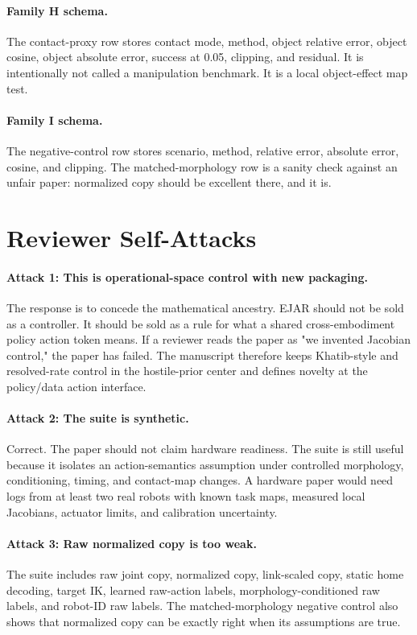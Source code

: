 \documentclass{article}
\begin{document}
\paragraph{Family H schema.}
The contact-proxy row stores contact mode, method, object relative error, object cosine, object absolute error, success at 0.05, clipping, and residual. It is intentionally not called a manipulation benchmark. It is a local object-effect map test.

\paragraph{Family I schema.}
The negative-control row stores scenario, method, relative error, absolute error, cosine, and clipping. The matched-morphology row is a sanity check against an unfair paper: normalized copy should be excellent there, and it is.

\section{Reviewer Self-Attacks}

\paragraph{Attack 1: This is operational-space control with new packaging.}
The response is to concede the mathematical ancestry. EJAR should not be sold as a controller. It should be sold as a rule for what a shared cross-embodiment policy action token means. If a reviewer reads the paper as "we invented Jacobian control," the paper has failed. The manuscript therefore keeps Khatib-style and resolved-rate control in the hostile-prior center and defines novelty at the policy/data action interface.

\paragraph{Attack 2: The suite is synthetic.}
Correct. The paper should not claim hardware readiness. The suite is still useful because it isolates an action-semantics assumption under controlled morphology, conditioning, timing, and contact-map changes. A hardware paper would need logs from at least two real robots with known task maps, measured local Jacobians, actuator limits, and calibration uncertainty.

\paragraph{Attack 3: Raw normalized copy is too weak.}
The suite includes raw joint copy, normalized copy, link-scaled copy, static home decoding, target IK, learned raw-action labels, morphology-conditioned raw labels, and robot-ID raw labels. The matched-morphology negative control also shows that normalized copy can be exactly right when its assumptions are true.
\end{document}
